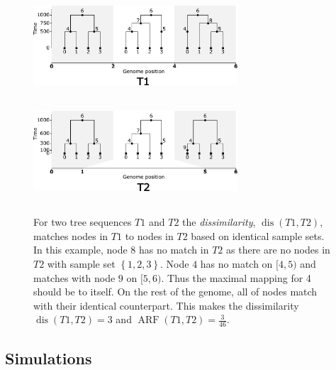 \documentclass[10pt,twoside,lineno]{gsajnl}
\newcommand{\dis}{\operatorname{dis}}
\begin{document}
\begin{figure}[!ht]
	\begin{center}
\includegraphics[height=1.5in, width=3in]{discrepancy_func_method_t1.pdf}
\includegraphics[height=1.5in, width=3in]{discrepancy_function_method_t2.pdf}
    \caption{
        For two tree sequences $T1$ and $T2$ the \emph{dissimilarity}, $\dis(T1,T2)$, matches nodes in $T1$ to nodes in $T2$
        based on identical sample sets.
        In this example, node $8$ has no match in $T2$ as there are no nodes in $T2$ with sample set $\left\{1,2,3\right\}$.
        Node $4$ has no match on $[4,5)$ and matches with node $9$ on $[5,6)$. Thus the maximal mapping for 4 should be to itself. On the rest of the genome, all of nodes match with their identical counterpart.
        This makes the dissimilarity $\dis(T1,T2)=3$ and $\operatorname{ARF}(T1,T2)=\frac{3}{46}$.
        \label{fig:conceptual_discrepancy}
    }
	\end{center}
\end{figure}

\subsection{Simulations}
\end{document}
